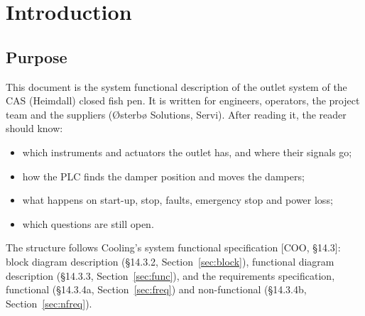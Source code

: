\documentclass[11pt,a4paper]{article}
\begin{document}
\maketitle

\begin{abstract}
\noindent The bottom outlet of the CAS closed pen has four dampers. Each damper is moved by a
hydraulic cylinder. A Servi hydraulic power unit (HPU) with a four-section HAWE PSL valve bank
drives the cylinders. The CAS PLC sets all four dampers to a common opening per operating mode. It
finds the position of each cylinder by counting pulses from an oil-flow meter, and detects end
positions by a rise in line pressure. This document describes the equipment, the control principle,
the sequences, interlocks and faults, and lists what is still open. It describes the PLC function
as implemented in ; it does not redesign it.
\end{abstract}

\setcounter{tocdepth}{1}
\tableofcontents
\clearpage

\section{Introduction}
\label{sec:intro}

\subsection{Purpose}
This document is the system functional description of the outlet system of the CAS (Heimdall)
closed fish pen. It is written for engineers, operators, the project team and the suppliers
(Østerbø Solutions, Servi). After reading it, the reader should know:
\begin{itemize}[nosep]
  \item which instruments and actuators the outlet has, and where their signals go;
  \item how the PLC finds the damper position and moves the dampers;
  \item what happens on start-up, stop, faults, emergency stop and power loss;
  \item which questions are still open.
\end{itemize}
The structure follows Cooling's system functional specification [COO, §14.3]: block diagram
description (§14.3.2, Section~\ref{sec:block}), functional diagram description (§14.3.3,
Section~\ref{sec:func}), and the requirements specification, functional (§14.3.4a,
Section~\ref{sec:freq}) and non-functional (§14.3.4b, Section~\ref{sec:nfreq}).
\end{document}
